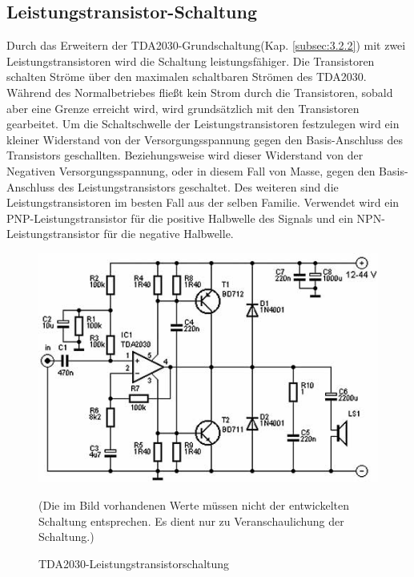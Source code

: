 \subsection{Leistungstransistor-Schaltung}\label{subsec:3.2.3}
Durch das Erweitern der TDA2030-Grundschaltung(Kap. \ref{subsec:3.2.2}) mit zwei Leistungstransistoren wird die Schaltung leistungsfähiger.
Die Transistoren schalten Ströme über den maximalen schaltbaren Strömen des TDA2030. Während des Normalbetriebes fließt kein Strom durch die Transistoren, sobald aber eine Grenze erreicht wird, wird grundsätzlich mit den Transistoren gearbeitet.
Um die Schaltschwelle der Leistungstransistoren festzulegen wird ein kleiner Widerstand von der Versorgungsspannung gegen den Basis-Anschluss des Transistors geschallten.
Beziehungsweise wird dieser Widerstand von der Negativen Versorgungsspannung, oder in diesem Fall von Masse, gegen den Basis-Anschluss des Leistungstransistors geschaltet.
Des weiteren sind die Leistungstransistoren im besten Fall aus der selben Familie.
Verwendet wird ein PNP-Leistungstransistor für die positive Halbwelle des Signals und ein NPN-Leistungstransistor für die negative Halbwelle.
\begin{figure} [H]
	\centering
	\includegraphics[width=1\textwidth]{img/Grundlagen/TDA2030/TDA2030-Leistungstransschaltung.jpg}
	\caption[TDA2030-Leistungstransistorschaltung]{TDA2030-Leistungstransistorschaltung\footnotemark}
	\text (Die im Bild vorhandenen Werte müssen nicht der entwickelten Schaltung entsprechen. Es dient nur zu Veranschaulichung der Schaltung.)
	\label {fig:3.2.3.1}
\end{figure}

